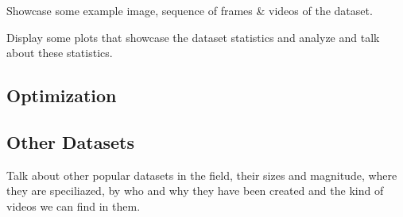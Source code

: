 Showcase some example image, sequence of frames \& videos of the dataset.

Display some plots that showcase the dataset statistics and analyze and talk about these statistics.

\subsection{Optimization}


\subsection{Other Datasets}

Talk about other popular datasets in the field, their sizes and magnitude, where they are speciliazed, by who and why they have been created and the kind of videos we can find in them.